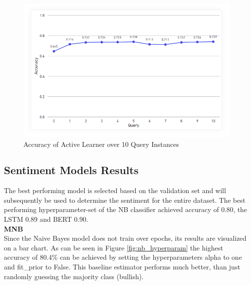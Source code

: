 \documentclass[11pt, a4paper]{article}
\begin{document}
\begin{figure}
    \centering
    \includegraphics[width=\textwidth]{ActiveLearner.png}
    \caption{Accuracy of Active Learner over 10 Query Instances}
    \label{fig:ActiveLearner}
\end{figure}

\subsection{Sentiment Models Results}
The best performing model is selected based on the validation set and will subsequently be used to determine the sentiment for the
entire dataset. The best performing hyperparameter-set of the NB classifier achieved accuracy of 0.80, the LSTM 0.89 and BERT 0.90. \\

\noindent\textbf{MNB}\\
Since the Naive Bayes model does not train over epochs, its results are visualized on a bar chart. As can be seen in Figure \ref{fig:nb_hyperparam} the
highest accuracy of 80.4\% can be achieved by setting the hyperparameters alpha to one and fit\_prior to False. This baseline estimator
performs much better, than just randomly guessing the majority class (bullish). \\
\end{document}
